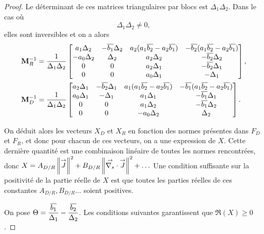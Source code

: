 \begin{proof}
    Le déterminant de ces matrices triangulaires par blocs est \(\Delta_1\Delta_2\). Dans le cas où
    \begin{equation*}
      \label{eq:unicite:ci3:csu3-cn-det}
      \Delta_1\Delta_2 \not = 0,
    \end{equation*}
    elles sont inversibles et on a alors
    \begin{align*}
      \mathbf{M}_R^{-1} & =\dfrac{1}{\Delta_1\Delta_2}
      \begin{bmatrix}
        a_1 \Delta_2 & -{\overline{b_1}}\Delta_2 & a_2(a_1{\overline{b_2}}-a_2{\overline{b_1}}) & -{\overline{b_2}}(a_1{\overline{b_2}}-a_2{\overline{b_1}})
        \\
        -a_0 \Delta_2 & \Delta_2 & a_2\Delta_2 & -{\overline{b_2}}\Delta_2
        \\
        0 & 0 & a_2\Delta_1 & -{\overline{b_2}}\Delta_1
        \\
        0 & 0 & a_0\Delta_1 & -\Delta_1
      \end{bmatrix},
      \\
      \mathbf{M}_D^{-1} & =\dfrac{1}{\Delta_1\Delta_2}
      \begin{bmatrix}
        a_2 \Delta_1 & -{\overline{b_2}}\Delta_1 & a_1(a_1{\overline{b_2}}-a_2{\overline{b_1}}) & -{\overline{b_1}}(a_1{\overline{b_2}}-a_2{\overline{b_1}})
        \\
        a_0 \Delta_1 & -\Delta_1 & a_1\Delta_1 & -{\overline{b_1}}\Delta_1
        \\
        0 & 0 & a_1\Delta_2 & -{\overline{b_1}}\Delta_2
        \\
        0 & 0 & -a_0\Delta_2 & \Delta_2
      \end{bmatrix}.
    \end{align*}
    
    On déduit alors les vecteurs \(X_D\) et \(X_R\) en fonction des normes présentes dans \(F_D\) et \(F_R\), et donc pour chacun de ces vecteurs, on a une expression de \(X\). 
    Cette dernière quantité est une combinaison linéaire de toutes les normes rencontrées, donc \(X = A_{D/R} \left\lVert{\overset{\rightarrow}{J}}\right\rVert^2 + B_{D/R} \left\lVert{\overset{\rightarrow}{\nabla_s}} \cdot {\overset{\rightarrow}{J}}\right\rVert^2 + \ldots \)
    Une condition suffisante sur la positivité de la partie réelle de \(X\) est que toutes les parties réelles de ces  constantes \(A_{D/R},B_{D/R} \ldots\) soient positives.

    On pose \(\Theta=\dfrac{{\overline{b_1}}}{\Delta_1}-\dfrac{{\overline{b_2}}}{\Delta_2}\). Les conditions suivantes garantissent que \(\Re(X)\ge 0\).


\end{proof}
